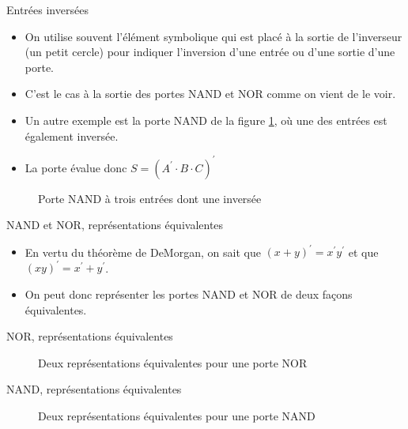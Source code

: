 \documentclass[presentation]{beamer}
\begin{document}
\begin{frame}[label={sec:org6b5ddc5}]{Entrées inversées}
\begin{itemize}
\item On utilise souvent l'élément symbolique qui est placé à la sortie de l'inverseur (un petit cercle) pour indiquer l'inversion d'une entrée ou d'une sortie d'une porte.

\item C'est le cas à la sortie des portes NAND et NOR comme on vient de le voir.

\item Un autre exemple est la porte NAND de la figure \ref{fig:org646fbce}, où une des entrées est également inversée.

\item La porte évalue donc \(S = (A^\prime \cdot B \cdot C)^\prime\)
\end{itemize}

\begin{figure}[htbp]
\centering

\caption{\label{fig:org646fbce}Porte NAND à trois entrées dont une inversée}
\end{figure} 
\end{frame}

\begin{frame}[label={sec:orgb318dc0}]{NAND et NOR, représentations équivalentes}
\begin{itemize}
\item En vertu du théorème de DeMorgan, on sait que \((x + y)^{\prime} = x^{\prime} y^{\prime}\) et que \((xy)^{\prime} = x^{\prime} + y^{\prime}\).

\item On peut donc représenter les portes NAND et NOR de deux façons équivalentes.
\end{itemize}
\end{frame}

\begin{frame}[label={sec:org1dba17a}]{NOR, représentations équivalentes}
\begin{figure}[htbp]
\centering

\caption{\label{fig:orga43d2ca}Deux représentations équivalentes pour une porte NOR}
\end{figure}
\end{frame}
\begin{frame}[label={sec:org2b00bf9}]{NAND, représentations équivalentes}
\begin{figure}[htbp]
\centering

\caption{\label{fig:org9062996}Deux représentations équivalentes pour une porte NAND}
\end{figure}
\end{frame}
\end{document}
